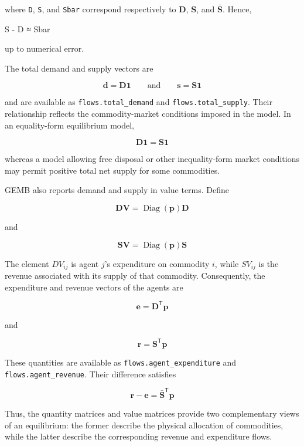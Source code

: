 \documentclass[
  letterpaper,
  DIV=11,
  numbers=noendperiod]{scrreprt}
\newenvironment{Shaded}{\begin{snugshade}}{\end{snugshade}}
\newcommand{\NormalTok}[1]{\textcolor[rgb]{0.00,0.23,0.31}{#1}}
\newcommand{\OperatorTok}[1]{\textcolor[rgb]{0.37,0.37,0.37}{#1}}
\begin{document}
where \texttt{D}, \texttt{S}, and \texttt{Sbar} correspond respectively
to \(\mathbf D\), \(\mathbf S\), and \(\bar{\mathbf S}\). Hence,

\begin{Shaded}
\begin{Highlighting}[]
\NormalTok{S }\OperatorTok{{-}}\NormalTok{ D }\OperatorTok{≈}\NormalTok{ Sbar}
\end{Highlighting}
\end{Shaded}

up to numerical error.

The total demand and supply vectors are

\[
\mathbf d
=
\mathbf D\mathbf 1
\qquad\text{and}\qquad
\mathbf s
=
\mathbf S\mathbf 1
\]

and are available as \texttt{flows.total\_demand} and
\texttt{flows.total\_supply}. Their relationship reflects the
commodity-market conditions imposed in the model. In an equality-form
equilibrium model,

\[
\mathbf D\mathbf 1
=
\mathbf S\mathbf 1
\]

whereas a model allowing free disposal or other inequality-form market
conditions may permit positive total net supply for some commodities.

GEMB also reports demand and supply in value terms. Define

\[
\mathbf{DV}
=
\operatorname{Diag}(\mathbf p)\mathbf D
\]

and

\[
\mathbf{SV}
=
\operatorname{Diag}(\mathbf p)\mathbf S
\]

The element \(DV_{ij}\) is agent \(j\)'s expenditure on commodity \(i\),
while \(SV_{ij}\) is the revenue associated with its supply of that
commodity. Consequently, the expenditure and revenue vectors of the
agents are

\[
\mathbf e
=
\mathbf D^{\mathsf T}\mathbf p
\]

and

\[
\mathbf r
=
\mathbf S^{\mathsf T}\mathbf p
\]

These quantities are available as \texttt{flows.agent\_expenditure} and
\texttt{flows.agent\_revenue}. Their difference satisfies

\[
\mathbf r-\mathbf e
=
\bar{\mathbf S}^{\mathsf T}\mathbf p
\]

Thus, the quantity matrices and value matrices provide two complementary
views of an equilibrium: the former describe the physical allocation of
commodities, while the latter describe the corresponding revenue and
expenditure flows.
\end{document}
